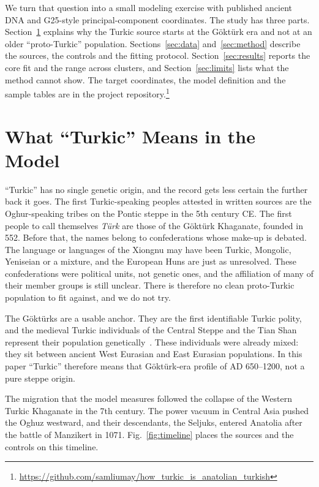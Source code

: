 \documentclass[conference,a4paper]{IEEEtran}
\begin{document}
We turn that question into a small modeling exercise with published ancient DNA and G25-style principal-component coordinates. The study has three parts. Section~\ref{sec:anchor} explains why the Turkic source starts at the Göktürk era and not at an older ``proto-Turkic'' population. Sections~\ref{sec:data} and~\ref{sec:method} describe the sources, the controls and the fitting protocol. Section~\ref{sec:results} reports the core fit and the range across clusters, and Section~\ref{sec:limits} lists what the method cannot show. The target coordinates, the model definition and the sample tables are in the project repository.\footnote{\url{https://github.com/samliumay/how_turkic_is_anatolian_turkish}}

\section{What ``Turkic'' Means in the Model}\label{sec:anchor}
``Turkic'' has no single genetic origin, and the record gets less certain the further back it goes. The first Turkic-speaking peoples attested in written sources are the Oghur-speaking tribes on the Pontic steppe in the 5th century CE. The first people to call themselves \textit{Türk} are those of the Göktürk Khaganate, founded in 552. Before that, the names belong to confederations whose make-up is debated. The language or languages of the Xiongnu may have been Turkic, Mongolic, Yeniseian or a mixture, and the European Huns are just as unresolved. These confederations were political units, not genetic ones, and the affiliation of many of their member groups is still unclear. There is therefore no clean proto-Turkic population to fit against, and we do not try.

The Göktürks are a usable anchor. They are the first identifiable Turkic polity, and the medieval Turkic individuals of the Central Steppe and the Tian Shan represent their population genetically~\cite{damgaard2018steppes,jeong2020}. These individuals were already mixed: they sit between ancient West Eurasian and East Eurasian populations. In this paper ``Turkic'' therefore means that Göktürk-era profile of AD 650--1200, not a pure steppe origin.

The migration that the model measures followed the collapse of the Western Turkic Khaganate in the 7th century. The power vacuum in Central Asia pushed the Oghuz westward, and their descendants, the Seljuks, entered Anatolia after the battle of Manzikert in 1071. Fig.~\ref{fig:timeline} places the sources and the controls on this timeline.
\end{document}
